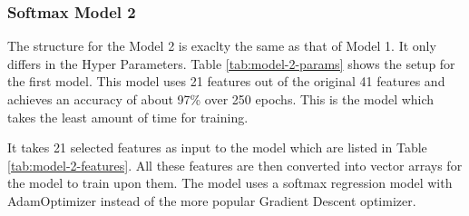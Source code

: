\documentclass[12pt]{article}
\theoremstyle{definition}
\begin{document}
		\subsubsection{Softmax Model 2}
		The structure for the Model 2 is exaclty the same as that of Model 1. It only differs in the Hyper Parameters. Table \ref{tab:model-2-params} shows the setup for the first model. This model uses 21 features out of the original 41 features and achieves an accuracy of about 97\% over 250 epochs. This is the model which takes the least amount of time for training. 
		
		It takes 21 selected features as input to the model which are listed in Table \ref{tab:model-2-features}. All these features are then converted into vector arrays for the model to train upon them. The model uses a softmax regression model with AdamOptimizer instead of the more popular Gradient Descent optimizer. 
		
\end{document}
